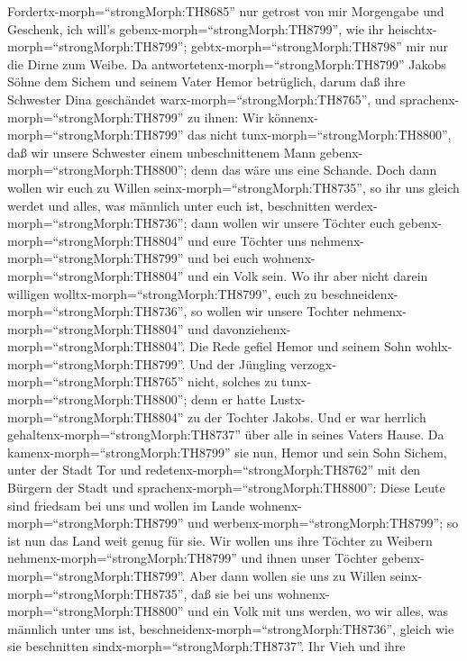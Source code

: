 Fordertx-morph=``strongMorph:TH8685'' nur getrost von mir Morgengabe und
Geschenk, ich will's gebenx-morph=``strongMorph:TH8799'', wie ihr
heischtx-morph=``strongMorph:TH8799'';
gebtx-morph=``strongMorph:TH8798'' mir nur die Dirne zum Weibe.
 Da antwortetenx-morph=``strongMorph:TH8799'' Jakobs Söhne
dem Sichem und seinem Vater Hemor betrüglich, darum daß ihre Schwester
Dina geschändet warx-morph=``strongMorph:TH8765'',  und
sprachenx-morph=``strongMorph:TH8799'' zu ihnen: Wir
könnenx-morph=``strongMorph:TH8799'' das nicht
tunx-morph=``strongMorph:TH8800'', daß wir unsere Schwester einem
unbeschnittenem Mann gebenx-morph=``strongMorph:TH8800''; denn das wäre
uns eine Schande.  Doch dann wollen wir euch zu Willen
seinx-morph=``strongMorph:TH8735'', so ihr uns gleich werdet und alles,
was männlich unter euch ist, beschnitten
werdex-morph=``strongMorph:TH8736'';  dann wollen wir
unsere Töchter euch gebenx-morph=``strongMorph:TH8804'' und eure Töchter
uns nehmenx-morph=``strongMorph:TH8799'' und bei euch
wohnenx-morph=``strongMorph:TH8804'' und ein Volk sein.  Wo
ihr aber nicht darein willigen wolltx-morph=``strongMorph:TH8799'', euch
zu beschneidenx-morph=``strongMorph:TH8736'', so wollen wir unsere
Tochter nehmenx-morph=``strongMorph:TH8804'' und
davonziehenx-morph=``strongMorph:TH8804''.  Die Rede gefiel
Hemor und seinem Sohn wohlx-morph=``strongMorph:TH8799''. 
Und der Jüngling verzogx-morph=``strongMorph:TH8765'' nicht, solches zu
tunx-morph=``strongMorph:TH8800''; denn er hatte
Lustx-morph=``strongMorph:TH8804'' zu der Tochter Jakobs. Und er war
herrlich gehaltenx-morph=``strongMorph:TH8737'' über alle in seines
Vaters Hause.  Da kamenx-morph=``strongMorph:TH8799'' sie
nun, Hemor und sein Sohn Sichem, unter der Stadt Tor und
redetenx-morph=``strongMorph:TH8762'' mit den Bürgern der Stadt und
sprachenx-morph=``strongMorph:TH8800'':  Diese Leute sind
friedsam bei uns und wollen im Lande
wohnenx-morph=``strongMorph:TH8799'' und
werbenx-morph=``strongMorph:TH8799''; so ist nun das Land weit genug für
sie. Wir wollen uns ihre Töchter zu Weibern
nehmenx-morph=``strongMorph:TH8799'' und ihnen unser Töchter
gebenx-morph=``strongMorph:TH8799''.  Aber dann wollen sie
uns zu Willen seinx-morph=``strongMorph:TH8735'', daß sie bei uns
wohnenx-morph=``strongMorph:TH8800'' und ein Volk mit uns werden, wo wir
alles, was männlich unter uns ist,
beschneidenx-morph=``strongMorph:TH8736'', gleich wie sie beschnitten
sindx-morph=``strongMorph:TH8737''.  Ihr Vieh und ihre
